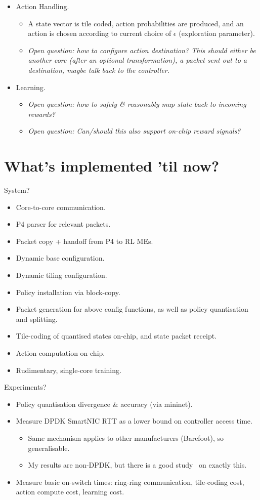 \documentclass[sigconf,natbib=false]{acmart}
\begin{document}
\begin{itemize}
	\item Action Handling.
	\begin{itemize}
		\item A state vector is tile coded, action probabilities are produced, and an action is chosen according to current choice of $\epsilon$ (exploration parameter).
		\item \emph{Open question: how to configure action destination? This should either be another core (after an optional transformation), a packet sent out to a destination, maybe talk back to the controller.}
	\end{itemize}
	\item Learning.
	\begin{itemize}
		\item \emph{Open question: how to safely \& reasonably map state back to incoming rewards?}
		\item \emph{Open question: Can/should this also support on-chip reward signals?}
	\end{itemize}
\end{itemize}

\section{What's implemented 'til now?}
System?
\begin{itemize}
	\item Core-to-core communication.
	\item P4 parser for relevant packets.
	\item Packet copy + handoff from P4 to RL MEs.
	\item Dynamic base configuration.
	\item Dynamic tiling configuration.
	\item Policy installation via block-copy.
	\item Packet generation for above config functions, as well as policy quantisation and splitting.
	\item Tile-coding of quantised states on-chip, and state packet receipt.
	\item Action computation on-chip.
	\item Rudimentary, single-core training.
\end{itemize}

Experiments?
\begin{itemize}
	\item Policy quantisation divergence \& accuracy (via mininet).
	\item Measure DPDK SmartNIC RTT as a lower bound on controller access time.
	\begin{itemize}
		\item Same mechanism applies to other manufacturers (Barefoot), so generalisable.
		\item My results are non-DPDK, but there is a good study~\parencite{DBLP:conf/sigcomm/NeugebauerAZAL018} on exactly this.
	\end{itemize}
	\item Measure basic on-switch times: ring-ring communication, tile-coding cost, action compute cost, learning cost.
\end{itemize}
\end{document}
